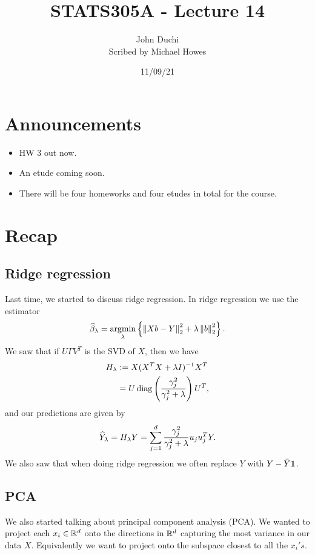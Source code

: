 


\newcommand{\pc}{{\text{pcr}(k)}}
\newcommand{\rhat}{\wh{\text{Risk}}}

\title{STATS305A - Lecture 14}
\author{John Duchi\\ Scribed by Michael Howes}
\date{11/09/21}

\pagestyle{fancy}
\fancyhf{}


\maketitle
\tableofcontents
\section{Announcements}
\begin{itemize}
    \item HW 3 out now.
    \item An etude coming soon.
    \item There will be four homeworks and four etudes in total for the course.
\end{itemize}
\section{Recap}
\subsection{Ridge regression}
Last time, we started to discuss ridge regression. In ridge regression we use the estimator
\[\widehat{\beta}_\lambda = \operatorname*{argmin}_\lambda \left\{\left\|Xb-Y\right\|_2^2+\lambda\left\|b\right\|_2^2\right\}. \]
We saw that if $U\Gamma V^T$ is the SVD of $X$, then we have 
\begin{align*}
    H_\lambda &:= X(X^TX+\lambda I)^{-1}X^T\\
    &= U\operatorname*{diag}\left(\frac{\gamma_j^2}{\gamma_j^2+\lambda}\right)U^T,
\end{align*}
and our predictions are given by
\[\widehat{Y}_\lambda = H_\lambda Y = \sum_{j=1}^d \frac{\gamma_j^2}{\gamma_j^2+\lambda}u_ju_j^TY. \]
We also saw that when doing ridge regression we often replace $Y$ with $Y-\bar{Y}{{\bf 1}}$.
\subsection{PCA}
We also started talking about principal component analysis (PCA). We wanted to project each $x_i \in {\mathbb R}^d$ onto the directions in ${\mathbb R}^d$ capturing the most variance in our data $X$. Equivalently we want to project onto the subspace closest to all the $x_i's$. 
